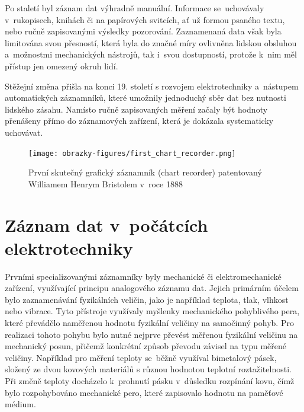Po staletí byl záznam dat výhradně manuální. Informace se~uchovávaly v~rukopisech, knihách či na papírových svitcích, ať už formou psaného textu, nebo ručně zapisovanými výsledky pozorování. Zaznamenaná data však byla limitována svou přesností, která byla do značné míry ovlivněna lidskou obsluhou a~možnostmi mechanických nástrojů, tak i~svou dostupností, protože k~nim měl přístup jen omezený okruh lidí.~\cite{rcp_analog_vs_digital}

Stěžejní změna přišla na konci 19. století s rozvojem elektrotechniky a~nástupem automatických záznamníků, které umožnily jednoduchý sběr dat bez nutnosti lidského zásahu. Namísto ručně zapisovaných měření začaly být hodnoty přenášeny přímo do záznamových zařízení, která je dokázala systematicky uchovávat.~\cite{origin_of_chart_recorders}

\begin{figure}[h] %
    \centering
    \texttt{[image: obrazky-figures/first\_chart\_recorder.png]}
    \caption{První skutečný grafický záznamník (chart recorder) patentovaný Williamem Henrym Bristolem v~roce 1888~\cite{bristol_chart_recorders}}
    \label{fig:chart_recorder}  
\end{figure}

\section{Záznam dat v~počátcích elektrotechniky}
\label{zaznam}
Prvními specializovanými záznamníky byly mechanické či elektromechanické zařízení, využívající principu analogového záznamu dat. Jejich primárním účelem bylo zaznamenávání fyzikálních veličin, jako je například teplota, tlak, vlhkost nebo vibrace. Tyto přístroje využívaly myšlenky mechanického pohyblivého pera, které převádělo naměřenou hodnotu fyzikální veličiny na samočinný pohyb. Pro realizaci tohoto pohybu bylo nutné nejprve převést měřenou fyzikální veličinu na mechanický posun, přičemž konkrétní způsob převodu závisel na typu měřené veličiny. Například pro měření teploty se~běžně využíval bimetalový pásek, složený ze dvou kovových materiálů s různou hodnotou teplotní roztažitelnosti. Při změně teploty docházelo k~prohnutí pásku v~důsledku rozpínání kovu, čímž bylo rozpohybováno mechanické pero, které zapisovalo hodnotu na paměťové médium.~\cite{thermohydro_graph}

